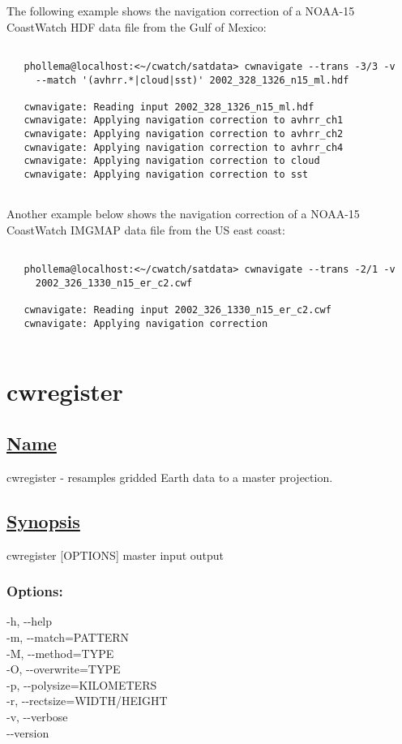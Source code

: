   The following example shows the navigation correction of a NOAA-15 CoastWatch HDF data file from the Gulf of Mexico: \begin{verbatim}

   phollema@localhost:<~/cwatch/satdata> cwnavigate --trans -3/3 -v 
     --match '(avhrr.*|cloud|sst)' 2002_328_1326_n15_ml.hdf

   cwnavigate: Reading input 2002_328_1326_n15_ml.hdf
   cwnavigate: Applying navigation correction to avhrr_ch1
   cwnavigate: Applying navigation correction to avhrr_ch2
   cwnavigate: Applying navigation correction to avhrr_ch4
   cwnavigate: Applying navigation correction to cloud
   cwnavigate: Applying navigation correction to sst
 
\end{verbatim}
 Another example below shows the navigation correction of a NOAA-15 CoastWatch IMGMAP data file from the US east coast: \begin{verbatim}

   phollema@localhost:<~/cwatch/satdata> cwnavigate --trans -2/1 -v 
     2002_326_1330_n15_er_c2.cwf

   cwnavigate: Reading input 2002_326_1330_n15_er_c2.cwf
   cwnavigate: Applying navigation correction
 
\end{verbatim}


\newpage
\section{cwregister} \hypertarget{cwregister}{}
\subsection*{\underline{Name}}


   cwregister - resamples gridded Earth data to a master projection.  
\subsection*{\underline{Synopsis}}


 cwregister [OPTIONS] master input output
\subsubsection*{Options:}


  -h, -{-}help \\ 
 -m, -{-}match=PATTERN \\ 
 -M, -{-}method=TYPE \\ 
 -O, -{-}overwrite=TYPE \\ 
 -p, -{-}polysize=KILOMETERS \\ 
 -r, -{-}rectsize=WIDTH/HEIGHT \\ 
 -v, -{-}verbose \\ 
 -{-}version \\ 

